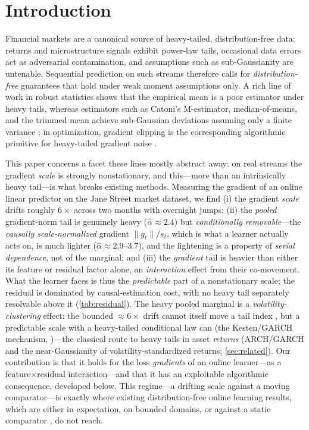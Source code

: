 \documentclass{article}
\newcommand{\norm}[1]{\lVert #1 \rVert}
\newcommand{\gt}{g_t}
\begin{document}
\section{Introduction}
\label{sec:intro}

Financial markets are a canonical source of heavy-tailed, distribution-free data:
returns and microstructure signals exhibit power-law tails, occasional data errors
act as adversarial contamination, and assumptions such as sub-Gaussianity are
untenable. Sequential prediction on such streams therefore calls for
\emph{distribution-free} guarantees that hold under weak moment assumptions only.
A rich line of work in robust statistics shows that the empirical mean is a poor
estimator under heavy tails, whereas estimators such as Catoni's M-estimator,
median-of-means, and the trimmed mean achieve sub-Gaussian deviations assuming only a
finite variance \citep{catoni2012,devroye2016,lugosi2019}; in optimization, gradient
clipping is the corresponding algorithmic primitive for heavy-tailed gradient noise
\citep{zhang2020clip,gorbunov2020,nguyen2023}.

This paper concerns a facet these lines mostly abstract away: on real streams the
gradient \emph{scale} is strongly nonstationary, and this---more than an intrinsically
heavy tail---is what breaks existing methods. Measuring the gradient of an online linear
predictor on the Jane Street market dataset, we find (i) the gradient \emph{scale}
drifts roughly $6\times$ across two months with overnight jumps; (ii) the \emph{pooled}
gradient-norm tail is genuinely heavy ($\hat\alpha\approx2.4$) but \emph{conditionally
removable}---the \emph{causally scale-normalized} gradient $\norm{\gt}/s_t$, which is what
a learner actually acts on, is much lighter ($\hat\alpha\approx2.9$--$3.7$), and the
lightening is a property of \emph{serial dependence}, not of the marginal; and (iii) the
\emph{gradient} tail is heavier than either its feature or residual factor alone, an
\emph{interaction} effect from their co-movement. What the learner faces is thus the
\emph{predictable} part of a nonstationary scale; the residual is dominated by
causal-estimation cost, with no heavy tail separately resolvable above it
(\cref{tab:residual}). The
heavy pooled marginal is a \emph{volatility-clustering} effect: the bounded $\approx6\times$
drift cannot itself move a tail index \citep{breiman1965}, but a predictable scale with a
heavy-tailed conditional law can (the Kesten/GARCH mechanism, \citealt{kesten1973})---the
classical route to heavy tails in asset \emph{returns} (ARCH/GARCH and the near-Gaussianity
of volatility-standardized returns; \cref{sec:related}). Our contribution is that it holds
for the loss \emph{gradients} of an online learner---as a feature$\times$residual
interaction---and that it has an exploitable algorithmic consequence, developed below. This regime---a drifting scale against a moving
comparator---is exactly where existing distribution-free online learning results, which
are either in expectation, on bounded domains, or against a static comparator
\citep{zhang2026oco,zhangcutkosky2022}, do not reach.
\end{document}

